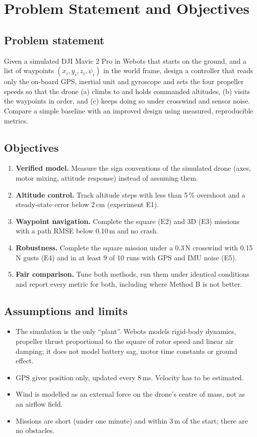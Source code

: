 \section{Problem Statement and Objectives}
\subsection{Problem statement}
Given a simulated DJI Mavic 2 Pro in Webots that starts on the ground, and a list of waypoints $(x_i, y_i, z_i, \psi_i)$ in the world frame, design a controller that reads only the on-board GPS, inertial unit and gyroscope and sets the four propeller speeds so that the drone (a) climbs to and holds commanded altitudes, (b) visits the waypoints in order, and (c) keeps doing so under crosswind and sensor noise. Compare a simple baseline with an improved design using measured, reproducible metrics.

\subsection{Objectives}
\begin{enumerate}[itemsep=0pt,topsep=2pt]
\item \textbf{Verified model.} Measure the sign conventions of the simulated drone (axes, motor mixing, attitude response) instead of assuming them.
\item \textbf{Altitude control.} Track altitude steps with less than 5\,\% overshoot and a steady-state error below 2\,cm (experiment E1).
\item \textbf{Waypoint navigation.} Complete the square (E2) and 3D (E3) missions with a path RMSE below 0.10\,m and no crash.
\item \textbf{Robustness.} Complete the square mission under a 0.3\,N crosswind with 0.15\,N gusts (E4) and in at least 9 of 10 runs with GPS and IMU noise (E5).
\item \textbf{Fair comparison.} Tune both methods, run them under identical conditions and report every metric for both, including where Method B is not better.
\end{enumerate}

\subsection{Assumptions and limits}
\begin{itemize}[itemsep=0pt,topsep=2pt]
\item The simulation is the only ``plant''. Webots models rigid-body dynamics, propeller thrust proportional to the square of rotor speed and linear air damping; it does not model battery sag, motor time constants or ground effect.
\item GPS gives position only, updated every 8\,ms. Velocity has to be estimated.
\item Wind is modelled as an external force on the drone's centre of mass, not as an airflow field.
\item Missions are short (under one minute) and within 3\,m of the start; there are no obstacles.
\end{itemize}
